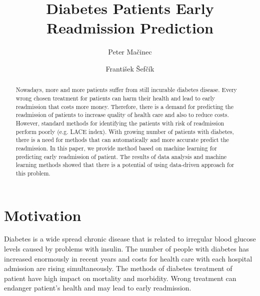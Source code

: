 \documentclass[runningheads]{llncs}
\begin{document}
%
\title{Diabetes Patients Early Readmission Prediction}
%
%
\author{Peter Mačinec \and
František Šefčík}
%
%
%
\maketitle              %
%
\begin{abstract}
Nowadays, more and more patients suffer from still incurable diabetes disease. Every wrong chosen treatment for patients can harm their health and lead to early readmission that costs more money. Therefore, there is a demand for predicting the readmission of patients to increase quality of health care and also to reduce costs. However, standard methods for identifying the patients with risk of readmission perform poorly (e.g. LACE index). With growing number of patients with diabetes, there is a need for methods that can automatically and more accurate predict the readmission. In this paper, we provide method based on machine learning for predicting early readmission of patient. The results of data analysis and machine learning methods showed that there is a potential of using data-driven approach for this problem.

\end{abstract}


\section{Motivation}

Diabetes is a wide spread chronic disease that is related to irregular blood glucose levels caused by problems with insulin. The number of people with diabetes has increased enormously in recent years and costs for health care with each hospital admission are rising simultaneously. The methods of diabetes treatment of patient have high impact on mortality and morbidity. Wrong treatment can endanger patient's health and may lead to early readmission.
\end{document}
